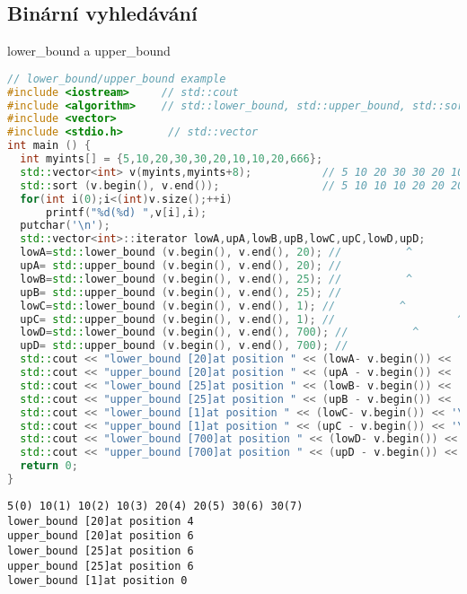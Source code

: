 \documentclass[11pt]{article}
\begin{document}
\subsection{Binární vyhledávání}
\begin{center}
lower\_bound a upper\_bound
\end{center}
\begin{lstlisting}[language=C++]
// lower_bound/upper_bound example
#include <iostream>     // std::cout
#include <algorithm>    // std::lower_bound, std::upper_bound, std::sort
#include <vector>
#include <stdio.h>       // std::vector
int main () {
  int myints[] = {5,10,20,30,30,20,10,10,20,666};
  std::vector<int> v(myints,myints+8);           // 5 10 20 30 30 20 10 10 20 666
  std::sort (v.begin(), v.end());                // 5 10 10 10 20 20 20 30 30 666
  for(int i(0);i<(int)v.size();++i)
      printf("%d(%d) ",v[i],i);
  putchar('\n');
  std::vector<int>::iterator lowA,upA,lowB,upB,lowC,upC,lowD,upD;
  lowA=std::lower_bound (v.begin(), v.end(), 20); //          ^
  upA= std::upper_bound (v.begin(), v.end(), 20); //                   ^
  lowB=std::lower_bound (v.begin(), v.end(), 25); //          ^
  upB= std::upper_bound (v.begin(), v.end(), 25); //                   ^
  lowC=std::lower_bound (v.begin(), v.end(), 1); //          ^
  upC= std::upper_bound (v.begin(), v.end(), 1); //                   ^
  lowD=std::lower_bound (v.begin(), v.end(), 700); //          ^
  upD= std::upper_bound (v.begin(), v.end(), 700); //                   ^
  std::cout << "lower_bound [20]at position " << (lowA- v.begin()) << '\n';
  std::cout << "upper_bound [20]at position " << (upA - v.begin()) << '\n';
  std::cout << "lower_bound [25]at position " << (lowB- v.begin()) << '\n';
  std::cout << "upper_bound [25]at position " << (upB - v.begin()) << '\n';
  std::cout << "lower_bound [1]at position " << (lowC- v.begin()) << '\n';
  std::cout << "upper_bound [1]at position " << (upC - v.begin()) << '\n';
  std::cout << "lower_bound [700]at position " << (lowD- v.begin()) << '\n';
  std::cout << "upper_bound [700]at position " << (upD - v.begin()) << '\n';
  return 0;
}
\end{lstlisting}
\verb|5(0) 10(1) 10(2) 10(3) 20(4) 20(5) 30(6) 30(7)|
\\\verb|lower_bound [20]at position 4|
\\\verb|upper_bound [20]at position 6|
\\\verb|lower_bound [25]at position 6|
\\\verb|upper_bound [25]at position 6|
\\\verb|lower_bound [1]at position 0|
\end{document}
